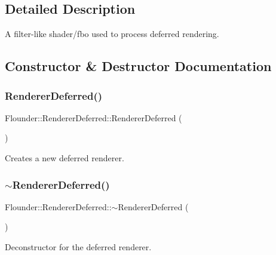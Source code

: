 \subsection{Detailed Description}
A filter-\/like shader/fbo used to process deferred rendering. 



\subsection{Constructor \& Destructor Documentation}
\mbox{\label{class_flounder_1_1_renderer_deferred_a8a8b1c4aa439f19825481b1a94778a13}} 
\subsubsection{\texorpdfstring{Renderer\+Deferred()}{RendererDeferred()}}
{\footnotesize\ttfamily Flounder\+::\+Renderer\+Deferred\+::\+Renderer\+Deferred (\begin{DoxyParamCaption}{ }\end{DoxyParamCaption})}



Creates a new deferred renderer. 

\mbox{\label{class_flounder_1_1_renderer_deferred_a355578e18eae962d24a73261e4529daf}} 
\subsubsection{\texorpdfstring{$\sim$\+Renderer\+Deferred()}{~RendererDeferred()}}
{\footnotesize\ttfamily Flounder\+::\+Renderer\+Deferred\+::$\sim$\+Renderer\+Deferred (\begin{DoxyParamCaption}{ }\end{DoxyParamCaption})}



Deconstructor for the deferred renderer. 



